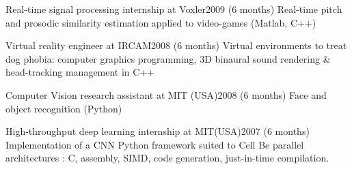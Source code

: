 \begin{en}
\begin{jobshort}{Real-time signal processing internship at Voxler}{2009 (6 months)}
Real-time pitch and prosodic similarity estimation applied to video-games (Matlab, C++)
\end{jobshort}

\begin{jobshort}{Virtual reality engineer at IRCAM}{2008 (6 months)}
Virtual environments to treat dog phobia: computer graphics programming, 3D binaural sound rendering \& head-tracking management in C++
\end{jobshort}

\begin{jobshort}{Computer Vision research assistant at MIT (USA)}{2008 (6 months)}
Face and object recognition (Python)
\end{jobshort}

\begin{jobshort}{High-throughput deep learning internship at MIT(USA)}{2007 (6 months)}
Implementation of a CNN Python framework suited to Cell Be parallel architectures : C, assembly, SIMD, code generation, just-in-time compilation.
\end{jobshort}


\end{en}








